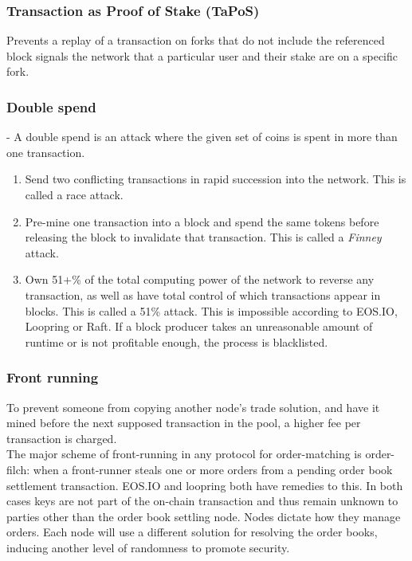 \documentclass[]{article}
\begin{document}
		\subsubsection{Transaction as Proof of Stake (TaPoS)}
			Prevents a replay of a transaction on forks that do not include the referenced block signals the network that a particular user and their stake are on a specific fork.
		\subsubsection{Double spend}-
		A double spend is an attack where the given set of coins is spent in more than one transaction.
		\begin{enumerate}
			\item Send two conflicting transactions in rapid succession into the network. This is called a race attack. 
			\item Pre-mine one transaction into a block and spend the same tokens before releasing the block to invalidate that transaction. This is called a \textit{Finney} attack.
			\item Own 51+\% of the total computing power of the network to reverse any transaction, as well as have total control of which transactions appear in blocks. This is called a 51\% attack.
			This is impossible according to EOS.IO, Loopring or Raft.
			If a block producer takes an unreasonable amount of runtime or is not profitable enough, the process is blacklisted.\cite{7}
		\end{enumerate} 

		\subsubsection{Front running}
		To prevent someone from copying another node's trade solution, 
		and have it mined before the next supposed transaction in the pool, 
		a higher fee per transaction is charged.\\ 
		The major scheme of front-running in any protocol for
		order-matching is order-filch: when a front-runner steals
		one or more orders from a pending order book settlement
		transaction. EOS.IO and loopring both have remedies to this.
		In both cases keys are not part of the on-chain transaction and thus remain unknown to parties other than the order book settling node.
		Nodes dictate how they manage orders.
		Each node will use a different solution for resolving the order books, inducing another level of randomness to promote security.
			
\end{document}
